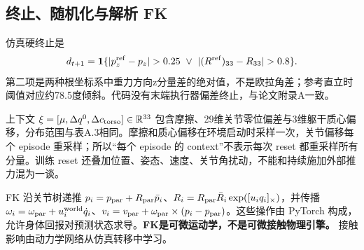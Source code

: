\subsection{终止、随机化与解析 FK}
仿真硬终止是
\begin{equation}\label{eq:hardterm}
 d_{t+1}=\mathbf1\{\lvert p_z^{\rm ref}-p_z\rvert>0.25\ \lor\ {}
 \lvert(R^{\rm ref})_{33}-R_{33}\rvert>0.8\}.
\end{equation}
第二项是两种根坐标系中重力方向z分量差的绝对值，不是欧拉角差；参考直立时阈值对应约78.5度倾斜。代码没有末端执行器偏差终止，与论文附录A一致。

上下文 $\xi=[\mu,\Delta q^0,\Delta c_{\rm torso}]\in\mathbb{R}^{33}$ 包含摩擦、29维关节零位偏差与3维躯干质心偏移，分布范围与表A.3相同。摩擦和质心偏移在环境启动时采样一次，关节偏移每个 episode 重采样；所以“每个 episode 的 context”不表示每次 reset 都重采样所有分量。训练 reset 还叠加位置、姿态、速度、关节角扰动，不能和持续施加外部推力混为一谈。

FK 沿关节树递推 $p_i=p_{\rm par}+R_{\rm par}\bar p_i$、$R_i=R_{\rm par}\bar R_i\exp([u_iq_i]_\times)$，并传播 $\omega_i=\omega_{\rm par}+u_i^{\rm world}\dot q_i$、$v_i=v_{\rm par}+\omega_{\rm par}\times(p_i-p_{\rm par})$。这些操作由 PyTorch 构成，允许身体回报对预测状态求导。\textbf{FK是可微运动学，不是可微接触物理引擎。} 接触影响由动力学网络从仿真转移中学习。
